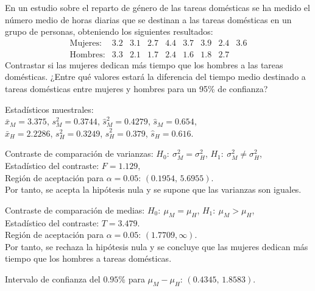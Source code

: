 {En un estudio sobre el reparto de género de las tareas domésticas se ha medido el número medio de horas diarias que se destinan a las
tareas domésticas en un grupo de personas, obteniendo los siguientes resultados:
\[
\begin{array}{lrrrrrrrr}
\text{Mujeres:} & 3.2 & 3.1 & 2.7 & 4.4 & 3.7 & 3.9 & 2.4 & 3.6 \\
\text{Hombres:} & 3.3 & 2.1 & 1.7 & 2.4 & 1.6 & 1.8 & 2.7 
\end{array}
\]
Contrastar si las mujeres dedican más tiempo que los hombres a las tareas domésticas. 
¿Entre qué valores estará la diferencia del tiempo medio destinado a tareas domésticas entre mujeres y hombres para un 95\% de confianza?
}
{Estadísticos muestrales:\\
$\bar x_M=3.375$, $s_M^2 = 0.3744$, $\hat s_M^2 = 0.4279$, $\hat s_M = 0.654$,\\ 
$\bar x_H=2.2286$, $s_H^2 = 0.3249$, $\hat s_H^2 = 0.379$, $\hat s_H = 0.616$.

Contraste de comparación de varianzas: $H_0:\ \sigma_M^2=\sigma_H^2$, \quad $H_1:\ \sigma_M^2\neq \sigma_H^2$,\\
Estadístico del contraste: $F=1.129$,\\
Región de aceptación para $\alpha=0.05$: $(0.1954,\,5.6955)$.\\
Por tanto, se acepta la hipótesis nula y se supone que las varianzas son iguales.

Contraste de comparación de medias: $H_0:\ \mu_M=\mu_H$, \quad $H_1:\ \mu_M> \mu_H$,\\
Estadístico del contraste: $T=3.479$.\\
Región de aceptación para $\alpha=0.05$: $(1.7709,\infty)$.\\
Por tanto, se rechaza la hipótesis nula y se concluye que las mujeres dedican más tiempo que los hombres a tareas domésticas.

Intervalo de confianza del $0.95$\% para $\mu_M-\mu_H$: $(0.4345,\,1.8583)$.
}
{
}


